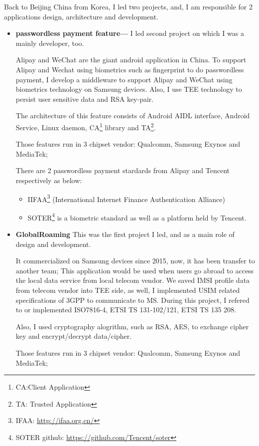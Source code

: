 \documentclass{article}
\begin{document}
Back to Beijing China from Korea, I led two projects, and, I am responsible for 2 applications design, architecture and development.

\begin{itemize}
\item{\textbf{passwordless payment feature---}}
I led second project on which I was a mainly developer, too.

Alipay and WeChat are the giant android application in China.
To support Alipay and Wechat using biometrics such as fingerprint to do passwordless payment,
I develop a middleware to support Alipay and WeChat using biometrics technology on Samsung devices.
Also, I use TEE technology to persist user sensitive data and RSA key-pair.

The architecture of this feature consists of Android AIDL interface, Android Service, Linux daemon, CA\footnote{CA:Client Application} library
and TA\footnote{TA: Trusted Application}.

Those features run in 3 chipset vendor: Qualcomm, Samsung Exynos and MediaTek;

There are 2 passwordless payment stardards from Alipay and Tencent respectively as below:

\begin{itemize}
\item[1]{IIFAA}\footnote{IFAA: \url{http://ifaa.org.cn/}}
(International Internet Finance Authentication Alliance)

\item[2]{SOTER}\footnote{SOTER github: \url{https://github.com/Tencent/soter}}
is a biometric standard as well as a platform held by Tencent.
\end{itemize}

\item{\textbf{GlobalRoaming}}
This was the first project I led, and as a main role of design and development.

It commercialized on Samsung devices since 2015, now, it has been transfer to another team;
This application would be used when users go abroad to access the local data service from local telecom vendor.
We saved IMSI profile data from telecom vendor into TEE side, as well, I implemented USIM related specifications of 3GPP to communicate to MS.
During this project, I refered to or implemented ISO7816-4, ETSI TS 131-102/121, ETSI TS 135 208.

Also, I used cryptography alogrithm, such as RSA, AES, to exchange cipher key and encrypt/decrypt data/cipher.

Those features run in 3 chipset vendor: Qualcomm, Samsung Exynos and MediaTek;

\end{itemize}
\end{document}
